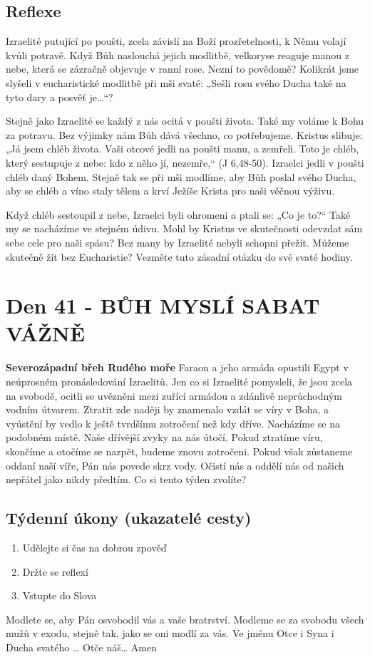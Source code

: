 \documentclass[11pt]{article}
\newcommand{\zacatekSestyTyden}{
  \textbf{Severozápadní břeh Rudého moře} \newline 
  Faraon a jeho armáda opustili Egypt v neúprosném pronásledování Izraelitů. Jen co si Izraelité pomysleli, že jsou zcela na svobodě, ocitli se uvězněni mezi zuřící armádou a zdánlivě neprůchodným vodním útvarem. Ztratit zde naději by znamenalo vzdát se víry v Boha, a vyústění by vedlo k ještě tvrdšímu zotročení než kdy dříve. Nacházíme se na podobném místě. Naše dřívější zvyky na nás útočí. Pokud ztratíme víru, skončíme a otočíme se nazpět, budeme znovu zotročeni. Pokud však zůstaneme oddaní naší víře, Pán nás povede skrz vody. Očistí nás a oddělí nás od našich nepřátel jako nikdy předtím. Co si tento týden zvolíte?

\subsection*{Týdenní úkony (ukazatelé cesty)}
\begin{enumerate}
  \item Udělejte si čas na dobrou zpověď
  \item Držte se reflexí
  \item Vstupte do Slova
\end{enumerate}
Modlete se, aby Pán osvobodil vás a vaše bratrství. \newline
Modleme se za svobodu všech mužů v exodu, stejně tak, jako se oni modlí za vás.\newline
Ve jménu Otce i Syna i Ducha svatého …  Otče náš… Amen
}
\begin{document}
\subsection*{Reflexe}
Izraelité putující po poušti, zcela závislí na Boží prozřetelnosti, k Němu volají kvůli potravě. Když Bůh naslouchá jejich modlitbě,
velkoryse reaguje manou z nebe, která se zázračně objevuje v ranní rose. Nezní to povědomě? Kolikrát jsme slyšeli
v eucharistické modlitbě při mši svaté: „Sešli rosu svého Ducha také na tyto dary a posvěť je…“?

Stejně jako Izraelité se každý z nás ocitá v poušti života. Také my voláme k Bohu za potravu. Bez výjimky nám Bůh dává všechno,
co potřebujeme. Kristus slibuje: „Já jsem chléb života. Vaši otcové jedli na poušti manu, a zemřeli. Toto je chléb, který sestupuje z
nebe: kdo z něho jí, nezemře,“ (J 6,48-50). Izraelci jedli v poušti chléb daný Bohem. Stejně tak se při mši modlíme, aby Bůh poslal
svého Ducha, aby se chléb a víno staly tělem a krví Ježíše Krista pro naši věčnou výživu.

Když chléb sestoupil z nebe, Izraelci byli ohromeni a ptali se: „Co je to?“ Také my se nacházíme ve stejném údivu. Mohl by
Kristus ve skutečnosti odevzdat sám sebe cele pro naši spásu? Bez many by Izraelité nebyli schopni přežít. Můžeme skutečně žít
bez Eucharistie? Vezměte tuto zásadní otázku do své svaté hodiny.



\newpage
\section{Den 41 - BŮH MYSLÍ SABAT VÁŽNĚ }
\zacatekSestyTyden
\end{document}
